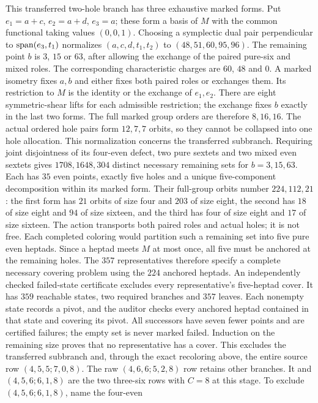 This transferred two-hole branch has three exhaustive marked forms.
Put $e_1=a+c$, $e_2=a+d$, $e_3=a$; these form a basis of $M$
with the common functional taking values $(0,0,1)$.
Choosing a symplectic dual pair perpendicular to $\operatorname{span}(e_3,t_1)$
normalizes $(a,c,d,t_1,t_2)$ to $(48,51,60,95,96)$.
The remaining point $b$ is $3$, $15$ or $63$, after allowing the
exchange of the paired pure-six and mixed roles. The corresponding
characteristic charges are $60$, $48$ and $0$. A marked isometry
fixes $a,b$ and either fixes both paired roles or exchanges them.
Its restriction to $M$ is the identity or the exchange of $e_1,e_2$.
There are eight symmetric-shear lifts for each admissible restriction;
the exchange fixes $b$ exactly in the last two forms. The full
marked group orders are therefore $8,16,16$. The actual ordered
hole pairs form $12,7,7$ orbits, so they cannot be collapsed into
one hole allocation. This normalization concerns the transferred
subbranch. Requiring joint disjointness of its four-even defect,
two pure sextets and two mixed even sextets gives $1708,1648,304$
distinct necessary remaining sets for $b=3,15,63$. Each has
$35$ even points, exactly five holes and a unique five-component
decomposition within its marked form. Their full-group orbits
number $224,112,21$: the first form has $21$ orbits of size four
and $203$ of size eight, the second has $18$ of size eight and
$94$ of size sixteen, and the third has four of size eight and
$17$ of size sixteen. The action transports both paired roles
and actual holes; it is not free. Each completed coloring would
partition such a remaining set into five pure even heptads.
Since a heptad meets $M$ at most once, all five must be anchored
at the remaining holes. The $357$ representatives therefore
specify a complete necessary covering problem using the $224$
anchored heptads. An independently checked failed-state certificate
excludes every representative's five-heptad cover. It has $359$
reachable states, two required branches and $357$ leaves. Each
nonempty state records a pivot, and the auditor checks every
anchored heptad contained in that state and covering its pivot.
All successors have seven fewer points and are certified failures;
the empty set is never marked failed. Induction on the remaining
size proves that no representative has a cover. This excludes
the transferred subbranch and, through the exact recoloring above,
the entire source row $(4,5,5;7,0,8)$.
The raw $(4,6,6;5,2,8)$ row retains other branches. It and
$(4,5,6;6,1,8)$ are the two three-six rows with $C=8$ at this stage.
To exclude $(4,5,6;6,1,8)$, name the four-even
